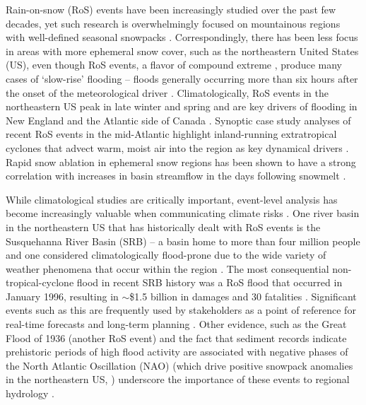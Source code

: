 \documentclass[nhess, manuscript]{copernicus}
\begin{document}
Rain-on-snow (RoS) events have been increasingly studied over the past few decades, yet such research is overwhelmingly focused on mountainous regions with well-defined seasonal snowpacks \citep{singh1997hydrological,mccabe2007rain,wayand2015modeling,sterle2019hydroclimate,musselman2018projected,poschlod2020climate,Hatchett2021,siirila2021a,heggli2022toward,yu2022diverse,brandt2022a,maina2023diverging,haleakala2023watershed}.
Correspondingly, there has been less focus in areas with more ephemeral snow cover, such as the northeastern United States (US), even though RoS events, a flavor of compound extreme \citep{aghakouchak2020climate}, produce many cases of `slow-rise' flooding -- floods generally occurring more than six hours after the onset of the meteorological driver \citep{dougherty2021high}.
Climatologically, RoS events in the northeastern US peak in late winter and spring \citep{ashley2008flood,villarini2010flood,dougherty2019climatology,wachowicz2020rain} and are key drivers of flooding in New England and the Atlantic side of Canada \citep{collins2014annual}.
Synoptic case study analyses of recent RoS events in the mid-Atlantic highlight inland-running extratropical cyclones that advect warm, moist air into the region as key dynamical drivers \citep{grote2021synoptic,suriano2023atmospheric}.
Rapid snow ablation in ephemeral snow regions has been shown to have a strong correlation with increases in basin streamflow in the days following snowmelt \citep{suriano2020discharge,suriano2023atmospheric}.

While climatological studies are critically important, event-level analysis has become increasingly valuable when communicating climate risks \citep{shepherd2018storylines}.
One river basin in the northeastern US that has historically dealt with RoS events is the Susquehanna River Basin (SRB) -- a basin home to more than four million people \citep{leathers2008hydroclimatic} and one considered climatologically flood-prone due to the wide variety of weather phenomena that occur within the region \citep{perry2000significant}.
The most consequential non-tropical-cyclone flood in recent SRB history was a RoS flood that occurred in January 1996, resulting in $\sim$\$1.5 billion in damages and 30 fatalities \citep{leathers1998severe}. Significant events such as this are frequently used by stakeholders as a point of reference for real-time forecasts and long-term planning \citep{george2019the}.
Other evidence, such as the Great Flood of 1936 (another RoS event) and the fact that sediment records indicate prehistoric periods of high flood activity are associated with negative phases of the North Atlantic Oscillation (NAO) (which drive positive snowpack anomalies in the northeastern US, \citep{hartley1998synoptic}) underscore the importance of these events to regional hydrology \citep{toomey2019the}.
\end{document}
